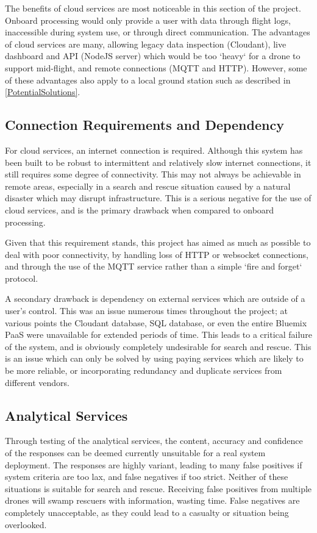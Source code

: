 \documentclass{article}
\begin{document}
The benefits of cloud services are most noticeable in this section of the project. Onboard processing would only provide a user with data through flight logs, inaccessible during system use, or through direct communication. The advantages of cloud services are many, allowing legacy data inspection (Cloudant), live dashboard and API (NodeJS server) which would be too `heavy` for a drone to support mid-flight, and remote connections (MQTT and HTTP). However, some of these advantages also apply to a local ground station such as described in \ref{PotentialSolutions}.


\subsection{Connection Requirements and Dependency}
For cloud services, an internet connection is required. Although this system has been built to be robust to intermittent and relatively slow internet connections, it still requires some degree of connectivity. This may not always be achievable in remote areas, especially in a search and rescue situation caused by a natural disaster which may disrupt infrastructure. This is a serious negative for the use of cloud services, and is the primary drawback when compared to onboard processing. 

Given that this requirement stands, this project has aimed as much as possible to deal with poor connectivity, by handling loss of HTTP or websocket connections, and through the use of the MQTT service rather than a simple `fire and forget` protocol. 

A secondary drawback is dependency on external services which are outside of a user's control. This was an issue numerous times throughout the project; at various points the Cloudant database, SQL database, or even the entire Bluemix PaaS were unavailable for extended periods of time. This leads to a critical failure of the system, and is obviously completely undesirable for search and rescue. This is an issue which can only be solved by using paying services which are likely to be more reliable, or incorporating redundancy and duplicate services from different vendors.  


\subsection{Analytical Services}
Through testing of the analytical services, the content, accuracy and confidence of the responses can be deemed currently unsuitable for a real system deployment. The responses are highly variant, leading to many false positives if system criteria are too lax, and false negatives if too strict. Neither of these situations is suitable for search and rescue. Receiving false positives from multiple drones will swamp rescuers with information, wasting time. False negatives are completely unacceptable, as they could lead to a casualty or situation being overlooked.   
\end{document}
